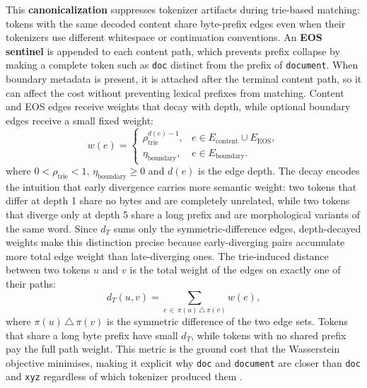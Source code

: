 This \textbf{canonicalization} suppresses tokenizer artifacts during trie-based
matching: tokens with the same decoded content share byte-prefix edges even
when their tokenizers use different whitespace or continuation conventions.
An \textbf{EOS sentinel} is appended to each content path, which prevents prefix
collapse by making a complete token such as \texttt{doc} distinct from the
prefix of \texttt{document}. When boundary metadata is present, it is attached
after the terminal content path, so it can affect the cost without preventing
lexical prefixes from matching. Content and EOS edges receive weights that
decay with depth, while optional boundary edges receive a small fixed weight:
\begin{equation}
w(e)=
\begin{cases}
\rho_{\mathrm{trie}}^{d(e)-1}, & e \in E_{\mathrm{content}}\cup E_{\mathrm{EOS}},\\
\eta_{\mathrm{boundary}}, & e \in E_{\mathrm{boundary}}.
\end{cases}
\label{eq:tw_edge_weight}
\end{equation}
where \(0<\rho_{\mathrm{trie}}<1\), \(\eta_{\mathrm{boundary}}\ge 0\) and
\(d(e)\) is the edge depth. The decay encodes the intuition that early
divergence carries more semantic weight: two tokens that differ at depth 1
share no bytes and are completely unrelated, while two tokens that diverge
only at depth 5 share a long prefix and are morphological variants of the
same word. Since \(d_T\) sums only the symmetric-difference edges,
depth-decayed weights make this distinction precise because early-diverging
pairs accumulate more total edge weight than late-diverging ones.
The trie-induced distance between two tokens
\(u\) and \(v\) is the total weight of the edges on exactly one of their paths:
\begin{equation}
d_T(u,v)
=
\sum_{e\,\in\,\pi(u)\,\triangle\,\pi(v)}
w(e),
\label{eq:trie-token-distance}
\end{equation}
where \(\pi(u)\,\triangle\,\pi(v)\) is the symmetric difference of the two
edge sets. Tokens that share a long byte prefix have small \(d_T\), while
tokens with no shared prefix pay the full path weight. This metric is the ground
cost that the Wasserstein objective minimises, making it explicit why
\texttt{doc} and \texttt{document} are closer than \texttt{doc} and \texttt{xyz}
regardless of which tokenizer produced them
\cite{takezawa2021supervisedtreewasserstein,peyre2019computationaloptimaltransport}.

